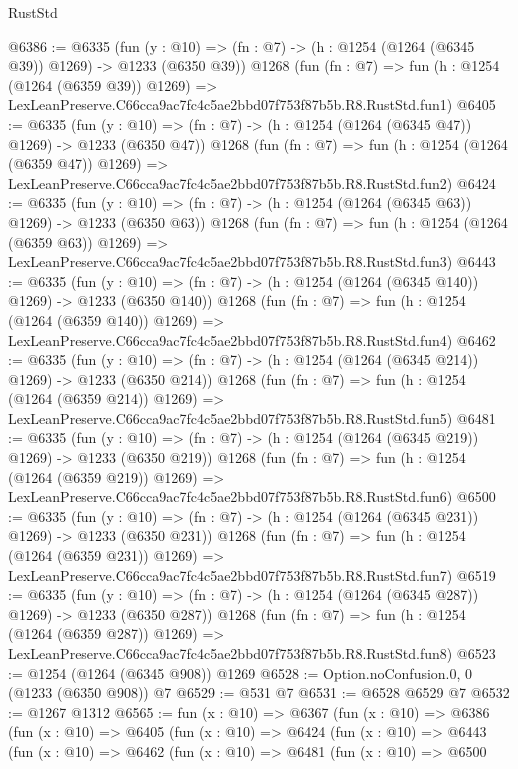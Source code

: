 \begin{lexlean}{RustStd}
\begin{coremodule}
@6386 := @6335
    (fun (y : @10) => (fn : @7) -> (h : @1254 (@1264 (@6345 @39)) @1269) -> @1233 (@6350 @39))
    @1268
    (fun (fn : @7) =>
    fun (h : @1254 (@1264 (@6359 @39)) @1269) =>
    LexLeanPreserve.C66cca9ac7fc4c5ae2bbd07f753f87b5b.R8.RustStd.fun1)
@6405 := @6335
    (fun (y : @10) => (fn : @7) -> (h : @1254 (@1264 (@6345 @47)) @1269) -> @1233 (@6350 @47))
    @1268
    (fun (fn : @7) =>
    fun (h : @1254 (@1264 (@6359 @47)) @1269) =>
    LexLeanPreserve.C66cca9ac7fc4c5ae2bbd07f753f87b5b.R8.RustStd.fun2)
@6424 := @6335
    (fun (y : @10) => (fn : @7) -> (h : @1254 (@1264 (@6345 @63)) @1269) -> @1233 (@6350 @63))
    @1268
    (fun (fn : @7) =>
    fun (h : @1254 (@1264 (@6359 @63)) @1269) =>
    LexLeanPreserve.C66cca9ac7fc4c5ae2bbd07f753f87b5b.R8.RustStd.fun3)
@6443 := @6335
    (fun (y : @10) => (fn : @7) -> (h : @1254 (@1264 (@6345 @140)) @1269) -> @1233 (@6350 @140))
    @1268
    (fun (fn : @7) =>
    fun (h : @1254 (@1264 (@6359 @140)) @1269) =>
    LexLeanPreserve.C66cca9ac7fc4c5ae2bbd07f753f87b5b.R8.RustStd.fun4)
@6462 := @6335
    (fun (y : @10) => (fn : @7) -> (h : @1254 (@1264 (@6345 @214)) @1269) -> @1233 (@6350 @214))
    @1268
    (fun (fn : @7) =>
    fun (h : @1254 (@1264 (@6359 @214)) @1269) =>
    LexLeanPreserve.C66cca9ac7fc4c5ae2bbd07f753f87b5b.R8.RustStd.fun5)
@6481 := @6335
    (fun (y : @10) => (fn : @7) -> (h : @1254 (@1264 (@6345 @219)) @1269) -> @1233 (@6350 @219))
    @1268
    (fun (fn : @7) =>
    fun (h : @1254 (@1264 (@6359 @219)) @1269) =>
    LexLeanPreserve.C66cca9ac7fc4c5ae2bbd07f753f87b5b.R8.RustStd.fun6)
@6500 := @6335
    (fun (y : @10) => (fn : @7) -> (h : @1254 (@1264 (@6345 @231)) @1269) -> @1233 (@6350 @231))
    @1268
    (fun (fn : @7) =>
    fun (h : @1254 (@1264 (@6359 @231)) @1269) =>
    LexLeanPreserve.C66cca9ac7fc4c5ae2bbd07f753f87b5b.R8.RustStd.fun7)
@6519 := @6335
    (fun (y : @10) => (fn : @7) -> (h : @1254 (@1264 (@6345 @287)) @1269) -> @1233 (@6350 @287))
    @1268
    (fun (fn : @7) =>
    fun (h : @1254 (@1264 (@6359 @287)) @1269) =>
    LexLeanPreserve.C66cca9ac7fc4c5ae2bbd07f753f87b5b.R8.RustStd.fun8)
@6523 := @1254 (@1264 (@6345 @908)) @1269
@6528 := Option.noConfusion.{0, 0} (@1233 (@6350 @908)) @7
@6529 := @531 @7
@6531 := @6528 @6529 @7
@6532 := @1267 @1312
@6565 := fun (x : @10) =>
  @6367
    (fun (x : @10) =>
    @6386
      (fun (x : @10) =>
      @6405
        (fun (x : @10) =>
        @6424
          (fun (x : @10) =>
          @6443
            (fun (x : @10) =>
            @6462
              (fun (x : @10) =>
              @6481
                (fun (x : @10) =>
                @6500

\end{coremodule}
\end{lexlean}
